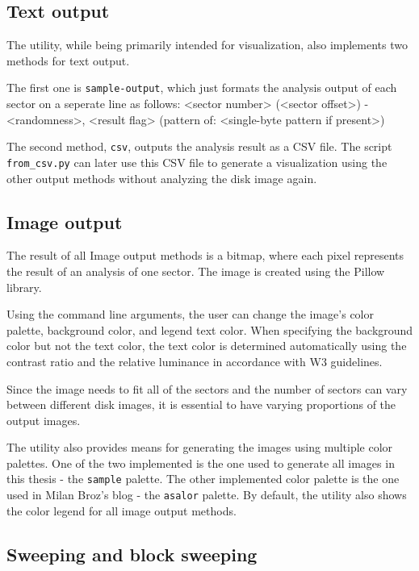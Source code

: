 \documentclass[
  digital, %
  oneside, %
  lof,     %
  lot,     %
]{fithesis4}
\begin{document}
\subsection{Text output}

The utility, while being primarily intended for visualization, also implements two methods for text output.

The first one is \texttt{sample-output}, which just formats the analysis output of each sector on a seperate line as follows: <sector number> (<sector offset>) - <randomness>, <result flag> (pattern of: <single-byte pattern if present>)

The second method, \texttt{csv}, outputs the analysis result as a CSV file.
The script \texttt{from\_csv.py} can later use this CSV file to generate a visualization using the other output methods without analyzing the disk image again.

\subsection{Image output}

The result of all Image output methods is a bitmap, where each pixel represents the result of an analysis of one sector.
The image is created using the Pillow library.

Using the command line arguments, the user can change the image's color palette, background color, and legend text color.
When specifying the background color but not the text color, the text color is determined automatically using the contrast ratio and the relative luminance in accordance with W3 guidelines.\cite{w3guidelines}

Since the image needs to fit all of the sectors and the number of sectors can vary between different disk images, it is essential to have varying proportions of the output images.

The utility also provides means for generating the images using multiple color palettes.
One of the two implemented is the one used to generate all images in this thesis - the \texttt{sample} palette.
The other implemented color palette is the one used in Milan Broz's blog\cite{broz11} - the \texttt{asalor} palette.
By default, the utility also shows the color legend for all image output methods.

\subsection{Sweeping and block sweeping}
\end{document}
